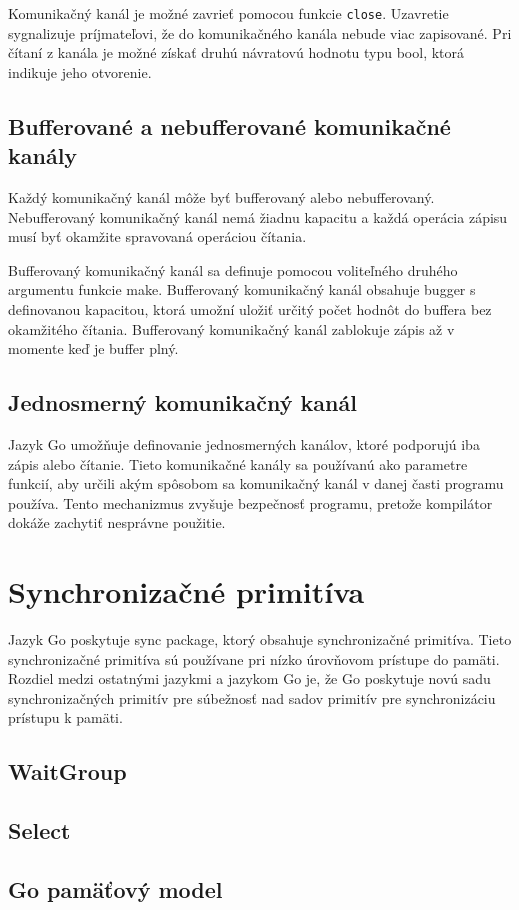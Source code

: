 \documentclass[
  biblatex,
  seconds=true,
  language=slovak,
  figures=false,
  glossaries,
  index
]{kidiplom}
\begin{document}
Komunikačný kanál je možné zavrieť pomocou funkcie \texttt{close}. Uzavretie sygnalizuje príjmateľovi, že do komunikačného kanála nebude viac zapisované.
Pri čítaní z kanála je možné získať druhú návratovú hodnotu typu bool, ktorá indikuje jeho otvorenie.
\subsection{Bufferované a nebufferované komunikačné kanály}
Každý komunikačný kanál môže byť bufferovaný alebo nebufferovaný. Nebufferovaný komunikačný kanál nemá žiadnu kapacitu a každá operácia zápisu musí
byť okamžite spravovaná operáciou čítania.

Bufferovaný komunikačný kanál sa definuje pomocou voliteľného druhého argumentu funkcie make.
Bufferovaný komunikačný kanál obsahuje bugger s definovanou kapacitou, ktorá umožní uložiť určitý počet hodnôt do buffera bez okamžitého čítania.
Bufferovaný komunikačný kanál zablokuje zápis až v momente keď je buffer plný.
\subsection{Jednosmerný komunikačný kanál}
Jazyk Go umožňuje definovanie jednosmerných kanálov, ktoré podporujú iba zápis alebo čítanie. Tieto komunikačné kanály sa používanú ako parametre 
funkcií, aby určili akým spôsobom sa komunikačný kanál v danej časti programu používa. Tento mechanizmus zvyšuje bezpečnosť programu, pretože
kompilátor dokáže zachytiť nesprávne použitie.

\section{Synchronizačné primitíva}
Jazyk Go poskytuje sync package, ktorý obsahuje synchronizačné primitíva. Tieto synchronizačné primitíva sú používane pri nízko úrovňovom
prístupe do pamäti. Rozdiel medzi ostatnými jazykmi a jazykom Go je, že Go poskytuje novú sadu synchronizačných primitív pre súbežnosť nad 
sadov primitív pre synchronizáciu prístupu k pamäti.

\newpage
\subsection{WaitGroup}
\subsection{Select}
\subsection{Go pamäťový model}
\end{document}
